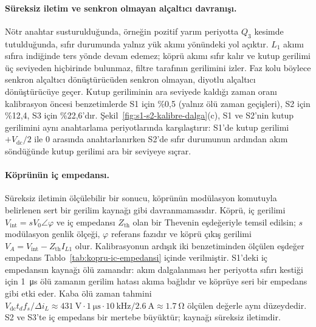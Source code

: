 \paragraph{Süreksiz iletim ve senkron olmayan alçaltıcı davranışı.} Nötr anahtar susturulduğunda, örneğin pozitif yarım periyotta $Q_3$ kesimde tutulduğunda, sıfır durumunda yalnız yük akımı yönündeki yol açıktır. $L_1$ akımı sıfıra indiğinde ters yönde devam edemez; köprü akımı sıfır kalır ve kutup gerilimi üç seviyeden hiçbirinde bulunmaz, filtre tarafının gerilimini izler. Faz kolu böylece senkron alçaltıcı dönüştürücüden senkron olmayan, diyotlu alçaltıcı dönüştürücüye geçer. Kutup geriliminin ara seviyede kaldığı zaman oranı kalibrasyon öncesi benzetimlerde S1 için \%0,5 (yalnız ölü zaman geçişleri), S2 için \%12,4, S3 için \%22,6'dır. Şekil~\ref{fig:s1-s2-kalibre-dalga}(c), S1 ve S2'nin kutup gerilimini aynı anahtarlama periyotlarında karşılaştırır: S1'de kutup gerilimi $+V_{\mathrm{dc}}/2$ ile 0 arasında anahtarlanırken S2'de sıfır durumunun ardından akım söndüğünde kutup gerilimi ara bir seviyeye sıçrar.

\paragraph{Köprünün iç empedansı.} Süreksiz iletimin ölçülebilir bir sonucu, köprünün modülasyon komutuyla belirlenen sert bir gerilim kaynağı gibi davranmamasıdır. Köprü, iç gerilimi $V_{\mathrm{int}}=sV_0\angle\varphi$ ve iç empedansı $Z_{\mathrm{th}}$ olan bir Thevenin eşdeğeriyle temsil edilsin; $s$ modülasyon genlik ölçeği, $\varphi$ referans fazıdır ve köprü çıkış gerilimi $V_A=V_{\mathrm{int}}-Z_{\mathrm{th}}I_{L1}$ olur. Kalibrasyonun ardışık iki benzetiminden ölçülen eşdeğer empedans Tablo~\ref{tab:kopru-ic-empedansi} içinde verilmiştir. S1'deki iç empedansın kaynağı ölü zamandır: akım dalgalanması her periyotta sıfırı kestiği için \SI{1}{\micro\second} ölü zamanın gerilim hatası akıma bağlıdır ve köprüye seri bir empedans gibi etki eder. Kaba ölü zaman tahmini $V_{\mathrm{dc}}t_df_s/\Delta i_L\approx\SI{431}{\volt}\cdot\SI{1}{\micro\second}\cdot\SI{10}{\kilo\hertz}/\SI{2.6}{\ampere}\approx\SI{1.7}{\ohm}$ ölçülen değerle aynı düzeydedir. S2 ve S3'te iç empedans bir mertebe büyüktür; kaynağı süreksiz iletimdir.


